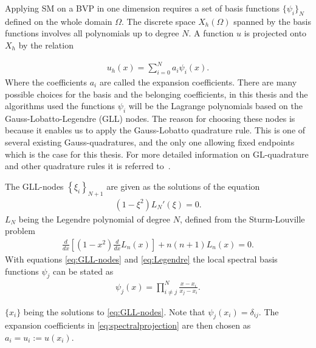 Applying SM on a BVP in one dimension requires a set of basis functions $\{\psi_i\}_N$ defined on the whole domain $\Omega$. 
The discrete space $X_h(\Omega)$ spanned by the basis functions involves all polynomials up to degree $N$.
A function $u$ is projected onto $X_h$ by the relation

\begin{align}
    u_h(x) = \sum_{i=0}^N a_i\psi_i(x).
    \label{eq:spectralprojection}
\end{align}
Where the coefficients $a_i$ are called the expansion coefficients. There are many possible choices for the basis and the belonging coefficients, 
in this thesis and the algorithms used the functions $\psi_i$ will be the Lagrange polynomials based on the Gauss-Lobatto-Legendre (GLL) nodes. 
The reason for choosing these nodes is because it enables us to apply the Gauss-Lobatto quadrature 
rule. This is one of several existing Gauss-quadratures, and the only one allowing fixed 
endpoints which is the case for this thesis. For more detailed information on GL-quadrature and 
other quadrature rules it is referred to~\cite{SM}.

The GLL-nodes $\left\{ \xi_i \right\}_{N+1}$ are given as the solutions of the equation 
\begin{align}
    (1-\xi^2)L_N'(\xi) = 0.
    \label{eq:GLL-nodes}
\end{align}
$L_N$ being the Legendre polynomial of degree $N$, defined from the Sturm-Louville problem
\begin{align}
    \frac{d}{dx}\left[  (1-x^2)\frac{d}{dx}L_n(x)\right]+n(n+1)L_n(x) = 0.
    \label{eq:Legendre}
\end{align}
With equations \ref{eq:GLL-nodes} and \ref{eq:Legendre} the local spectral 
basis functions $\psi_j$ can be stated as 
\begin{align}
    \psi_j(x) = \prod_{i\neq j}^{N}\frac{x-x_i}{x_j-x_i}.
    \label{eq:Lagrange}
\end{align}

$\{x_i\}$ being the solutions to \ref{eq:GLL-nodes}. Note that $\psi_j(x_i) = \delta_{ij}$.
The expansion coefficients in \ref{eq:spectralprojection} are then chosen as $a_i = u_i :=u(x_i)$. 

